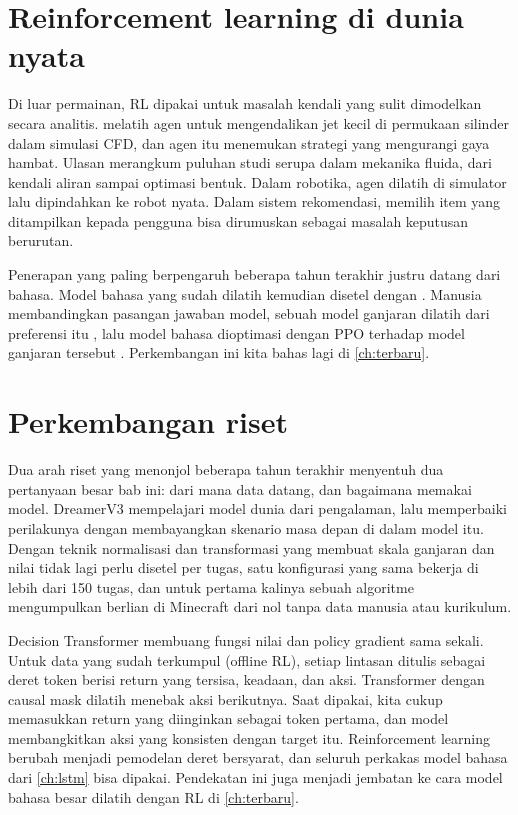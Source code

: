 \section{Reinforcement learning di dunia nyata}

Di luar permainan, RL dipakai untuk masalah kendali yang sulit dimodelkan secara analitis.
\citet{rabault2019} melatih agen untuk mengendalikan jet kecil di permukaan silinder dalam simulasi
CFD, dan agen itu menemukan strategi yang mengurangi gaya hambat. Ulasan \citet{garnier2021}
merangkum puluhan studi serupa dalam mekanika fluida, dari kendali aliran sampai optimasi bentuk.
Dalam robotika, agen dilatih di simulator lalu dipindahkan ke robot nyata. Dalam sistem rekomendasi,
memilih item yang ditampilkan kepada pengguna bisa dirumuskan sebagai masalah keputusan berurutan.

Penerapan yang paling berpengaruh beberapa tahun terakhir justru datang dari bahasa. Model bahasa
yang sudah dilatih kemudian disetel dengan .
Manusia membandingkan pasangan jawaban model, sebuah model ganjaran dilatih dari preferensi itu
\citep{christiano2017}, lalu model bahasa dioptimasi dengan PPO terhadap model ganjaran tersebut
\citep{ouyang2022}. Perkembangan ini kita bahas lagi di \cref{ch:terbaru}.

\section{Perkembangan riset}

Dua arah riset yang menonjol beberapa tahun terakhir menyentuh dua pertanyaan besar bab ini: dari mana data datang, dan
bagaimana memakai model. DreamerV3 \citep{hafner2023} mempelajari model dunia dari pengalaman, lalu memperbaiki
perilakunya dengan membayangkan skenario masa depan di dalam model itu. Dengan teknik normalisasi dan transformasi yang
membuat skala ganjaran dan nilai tidak lagi perlu disetel per tugas, satu konfigurasi yang sama bekerja di lebih dari 150
tugas, dan untuk pertama kalinya sebuah algoritme mengumpulkan berlian di Minecraft dari nol tanpa data manusia atau
kurikulum.

Decision Transformer \citep{chen2021dt} membuang fungsi nilai dan policy gradient sama sekali. Untuk data yang sudah
terkumpul (offline RL), setiap lintasan ditulis sebagai deret token berisi return yang tersisa, keadaan, dan aksi.
Transformer dengan causal mask dilatih menebak aksi berikutnya. Saat dipakai, kita cukup memasukkan return yang
diinginkan sebagai token pertama, dan model membangkitkan aksi yang konsisten dengan target itu. Reinforcement learning
berubah menjadi pemodelan deret bersyarat, dan seluruh perkakas model bahasa dari \cref{ch:lstm} bisa dipakai. Pendekatan
ini juga menjadi jembatan ke cara model bahasa besar dilatih dengan RL di \cref{ch:terbaru}.

